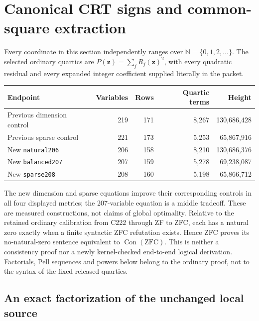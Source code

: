 \section{Canonical CRT signs and common-square extraction}
\label{sec:round20-natural}

Every coordinate in this section independently ranges over
\(\mathbb N=\{0,1,2,\ldots\}\). The selected ordinary quartics are
\(P(\mathbf z)=\sum_j R_j(\mathbf z)^2\), with every quadratic residual
and every expanded integer coefficient supplied literally in the packet.
\begin{center}
\begin{tabular}{lrrrr}
\hline
Endpoint & Variables & Rows & Quartic terms & Height\\
\hline
Previous dimension control &219&171&8,267&130,686,428\\
Previous sparse control &221&173&5,253&65,867,916\\
New \texttt{natural206} &206&158&8,210&130,686,376\\
New \texttt{balanced207} &207&159&5,278&69,238,087\\
New \texttt{sparse208} &208&160&5,198&65,866,712\\
\hline
\end{tabular}
\end{center}
The new dimension and sparse equations improve their corresponding controls
in all four displayed metrics; the 207-variable equation is a middle tradeoff.
These are measured constructions, not claims of global optimality.
Relative to the retained ordinary calibration from C222 through ZF to ZFC,
each has a natural
zero exactly when a finite syntactic ZFC refutation exists. Hence ZFC proves
its no-natural-zero sentence equivalent to \(\operatorname{Con}(\mathrm{ZFC})\).
This is neither a consistency proof nor a newly kernel-checked end-to-end
logical derivation. Factorials, Pell sequences and powers below belong to
the ordinary proof, not to the syntax of the fixed released quartics.

\subsection{An exact factorization of the unchanged local source}

